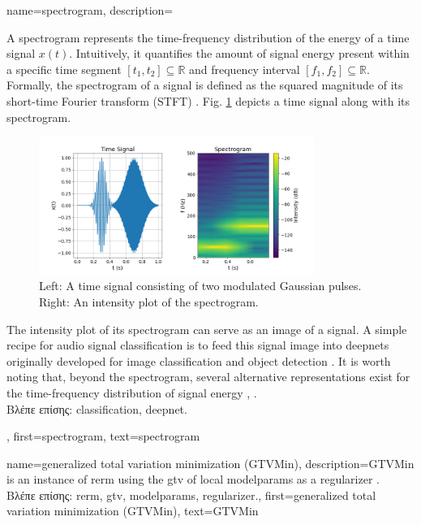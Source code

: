 \newcommand{\gaussiancenter}{3}

{name={spectrogram},
	description={A spectrogram represents the time-frequency distribution of the energy of a time signal $x(t)$.  
		Intuitively, it quantifies the amount of signal energy present within a specific time segment 
		$[t_{1},t_{2}] \subseteq \mathbb{R}$ and frequency interval $[f_{1},f_{2}]\subseteq \mathbb{R}$. 
		Formally, the spectrogram of a signal is defined as the squared magnitude of its 
		short-time Fourier transform (STFT) \cite{cohen1995time}.
        		Fig. \ref{fig:spectrogram_dict} depicts a time signal along with its spectrogram. 
		\begin{figure}[H]
			\centering
			\includegraphics[width=0.8\textwidth]{assets/spectrogram.png}
			\caption{Left: A time signal consisting of two modulated Gaussian pulses. Right: An intensity 
			plot of the spectrogram.
			\label{fig:spectrogram_dict}}
		\end{figure}
        		The intensity plot of its spectrogram can serve as an image of a signal. A 
		simple recipe for audio signal \gls{classification} is to feed this signal image 
		into \gls{deepnet}s originally developed for image \gls{classification} and object detection \cite{Li:2022aa}. 
		It is worth noting that, beyond the spectrogram, several alternative representations exist 
		for the time-frequency distribution of signal energy \cite{TimeFrequencyAnalysisBoashash}, \cite{MallatBook}.\\
		\foreignlanguage{greek}{Βλέπε επίσης:} \gls{classification}, \gls{deepnet}.}, 
	first={spectrogram},
	text={spectrogram}
}

{name={generalized total variation minimization (GTVMin)},
	description={GTVMin is an instance of \gls{rerm} 
		using the \gls{gtv} of local \gls{modelparams} as a \gls{regularizer} \cite{ClusteredFLTVMinTSP}.\\
		\foreignlanguage{greek}{Βλέπε επίσης:} \gls{rerm}, \gls{gtv}, \gls{modelparams}, \gls{regularizer}.},
	first={generalized total variation minimization (GTVMin)},
	text={GTVMin} 
}

